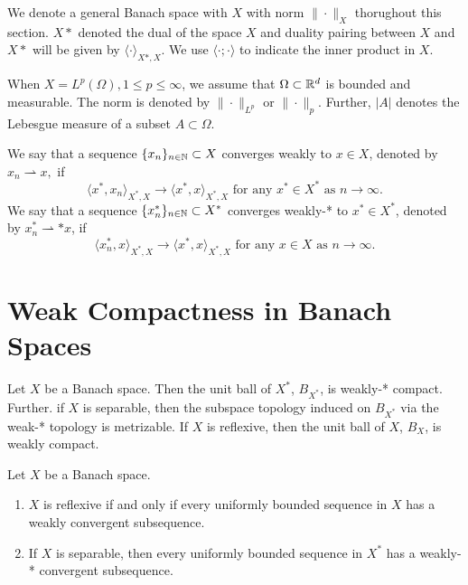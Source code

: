 
\label{ch:preliminaries}
We denote a general Banach space with $X$ with norm $\|\cdot\|_{X}$ thorughout this section. $X*$ denoted the dual of the space $X$ and duality pairing between $X$ and $X*$ will be given by $\langle \cdot \rangle_{X*, X}$. We use $\langle \cdot;\cdot\rangle$ to indicate the inner product in $X$.

When $X = L^p(\Omega), 1 \leq p \leq \infty$, we assume that $\Omega \subset \mathbb{R}^d$ is bounded and measurable. The norm is denoted by $\|\cdot\|_{L^p}$ or $\|\cdot\|_p$. Further, $|A|$ denotes the Lebesgue measure of a subset $A \subset \Omega$.

\begin{defn}
    We say that a sequence $\{x_n\}_{n\in \mathbb{N}} \subset X$ converges weakly to $x\in X$, denoted by $x_n \rightharpoonup x,$ if 
    $$ \langle x^*, x_n\rangle_{X^*, X} \to \langle x^*, x\rangle_{X^*, X} \text{ for any } x^* \in X^* \text{ as } n\to \infty.$$
    We say that a sequence $\{x_n^*\}_{n \in \mathbb{N}} \subset X^*$ converges weakly-* to $x^* \in X^*$, denoted by $x_n^* \rightharpoonup{*} x$, if 
    $$\langle x_n^*, x\rangle_{X^*, X} \to \langle x^*, x\rangle_{X^*, X} \text{ for any } x \in X \text{ as }n\to \infty.$$ 
\end{defn}

\section{Weak Compactness in Banach Spaces}
\begin{thm}\label{thm:alaoglu}
    Let $X$ be a Banach space. Then the unit ball of $X^*$, $B_{X^*}$, is weakly-* compact. Further. if $X$ is separable, then the subspace topology induced on $B_{X^*}$ via the weak-* topology is metrizable. If $X$ is reflexive, then the unit ball of $X$, $B_X$, is weakly compact.
\end{thm}
\begin{thm}\label{thm:bes}
    Let $X$ be a Banach space.
    \begin{enumerate}
        \item $X$ is reflexive if and only if every uniformly bounded sequence in $X$ has a weakly convergent subsequence.
        \item If $X$ is separable, then every uniformly bounded sequence in $X^*$ has a weakly-* convergent subsequence.
    \end{enumerate}
\end{thm}
